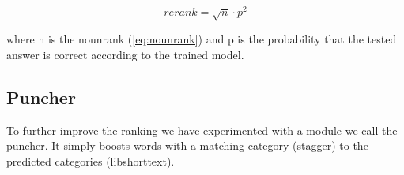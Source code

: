 \begin{equation}
rerank = \sqrt{n} \cdot p^2
\label{eq:rerank}
\end{equation}

where n is the nounrank (\ref{eq:nounrank}) and p is the probability that the tested answer is correct according 
to the trained model.

\subsection{Puncher}

To further improve the ranking we have experimented with a module we call the puncher. It simply boosts 
words with a matching category (stagger) to the predicted categories (libshorttext). 